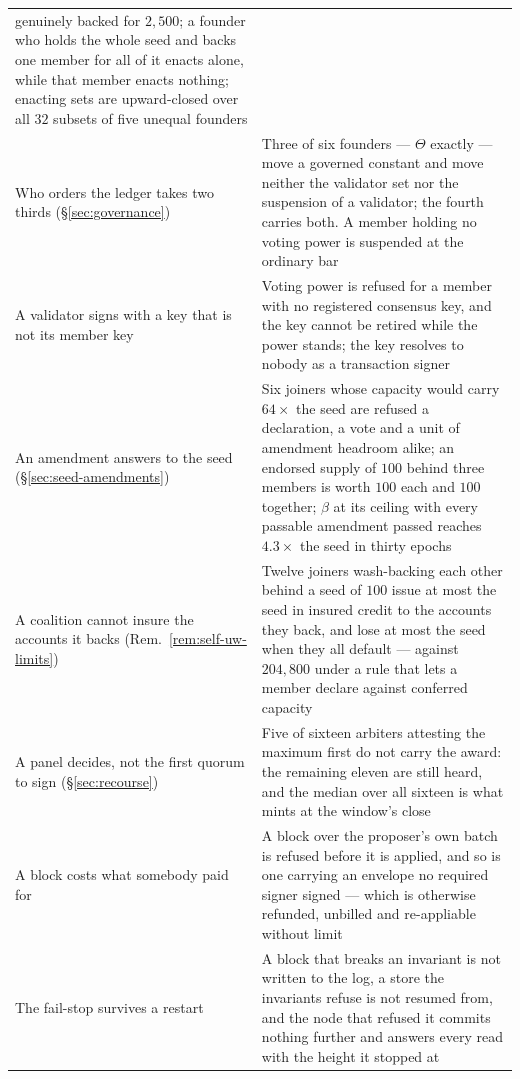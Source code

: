 \begin{longtable}{@{}p{}p{}@{}}
    genuinely backed for $2{,}500$; a founder who holds the whole seed and backs one
    member for all of it enacts alone, while that member enacts nothing; enacting sets
    are upward-closed over all $32$ subsets of five unequal founders \\
Who orders the ledger takes two thirds (\S\ref{sec:governance})
  & Three of six founders --- $\Theta$ exactly --- move a governed constant and move
    neither the validator set nor the suspension of a validator; the fourth carries both.
    A member holding no voting power is suspended at the ordinary bar \\
A validator signs with a key that is not its member key
  & Voting power is refused for a member with no registered consensus key, and the key
    cannot be retired while the power stands; the key resolves to nobody as a transaction
    signer \\
An amendment answers to the seed (\S\ref{sec:seed-amendments})
  & Six joiners whose capacity would carry $64\times$ the seed are refused a declaration,
    a vote and a unit of amendment headroom alike; an endorsed supply of $100$ behind
    three members is worth $100$ each and $100$ together; $\beta$ at its ceiling with
    every passable amendment passed reaches $4.3\times$ the seed in thirty epochs \\
A coalition cannot insure the accounts it backs (Rem.~\ref{rem:self-uw-limits})
  & Twelve joiners wash-backing each other behind a seed of $100$ issue at most the seed
    in insured credit to the accounts they back, and lose at most the seed when they all
    default --- against $204{,}800$ under a rule that lets a member declare against
    conferred capacity \\
A panel decides, not the first quorum to sign (\S\ref{sec:recourse})
  & Five of sixteen arbiters attesting the maximum first do not carry the award: the
    remaining eleven are still heard, and the median over all sixteen is what mints at
    the window's close \\
A block costs what somebody paid for
  & A block over the proposer's own batch is refused before it is applied, and so is one
    carrying an envelope no required signer signed --- which is otherwise refunded,
    unbilled and re-appliable without limit \\
The fail-stop survives a restart
  & A block that breaks an invariant is not written to the log, a store the invariants
    refuse is not resumed from, and the node that refused it commits nothing further and
    answers every read with the height it stopped at \\

\end{longtable}
